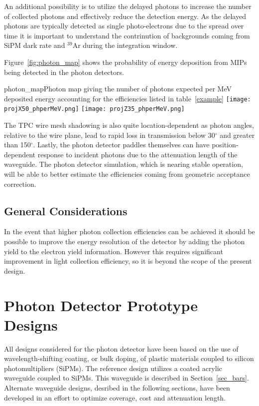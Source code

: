 An additional possibility is to utilize the delayed photons to
increase the number of collected photons and effectively reduce the
detection energy. As the delayed photons are typically detected as
single photo-electrons due to the spread over time it is important to
understand the contrinution of backgrounds coming from SiPM dark rate
and $^{39}$Ar during the integration window.   

Figure~\ref{fig:photon_map}
shows the probability of energy deposition from MIPs being
detected in the photon detectors.

\begin{cdrfigure}{photon_map}{Photon map giving the number of photons expected per MeV deposited energy accounting for the efficiencies listed in table~\ref{example}}
  \texttt{[image: projX50\_phperMeV.png]}
  \texttt{[image: projZ35\_phperMeV.png]}
\end{cdrfigure}

The TPC wire mesh shadowing is also quite location-dependent as photon
angles, relative to the wire plane, lead to rapid loss in transmission
below 30$^{\circ}$ and greater than 150$^{\circ}$. Lastly, the photon
detector paddles themselves can have position-dependent response to
incident photons due to the attenuation length of the waveguide. The
photon detector simulation, which is nearing stable operation, will be
able to better estimate the efficiencies coming from geometric
acceptance correction.

\subsection{General Considerations}

In the event that higher photon collection efficiencies can be
achieved it should be possible to improve the energy resolution of the
detector by adding the photon yield to the electron yield information.
However this requires significant improvement in light collection
efficiency, so it is beyond the scope of the present design. 

\section{Photon Detector Prototype Designs}

All designs considered for the photon detector have been based on the
use of wavelength-shifting coating, or bulk doping, of plastic
materials coupled to silicon photomultipliers (SiPMs). The reference
design utilizes a coated acrylic waveguide coupled to
SiPMs. This waveguide is described in
Section~\ref{sec_bars}. Alternate waveguide designs, desribed in the
following sections, have been developed in an effort to optimize
coverage, cost and attenuation length.  

